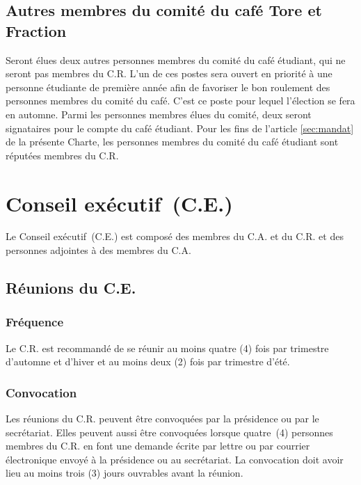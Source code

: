 \documentclass{aediroum}
\newcommand{\article}[1]{article \ref{#1}}
\begin{document}
\subsection{Autres membres du comité du café Tore et Fraction}\label{sec:autres-membres-du-comite-du-cafe-etudiant}

Seront élues deux autres personnes membres du comité du café étudiant, qui ne seront pas membres du C.R. L'un de ces postes sera ouvert en priorité à une personne étudiante de première année afin de favoriser le bon roulement des personnes membres du comité du café. C'est ce poste pour lequel l'élection se fera en automne. Parmi les personnes membres élues du comité, deux seront signataires pour le compte du café étudiant. Pour les fins de l'\article{sec:mandat} de la présente Charte, les personnes membres du comité du café étudiant sont réputées membres du C.R.

\section{Conseil exécutif~(C.E.)}
Le Conseil exécutif~(C.E.) est composé des membres du C.A. et du C.R. et des personnes
adjointes à des membres du C.A.

\subsection{Réunions du C.E.}\label{sec:reunions-du-conseil-dadministration}
\subsubsection{Fréquence}\label{sec:frequence}

Le C.R. est recommandé de se réunir au moins quatre (4) fois par trimestre d'automne et d'hiver et au moins deux (2) fois par trimestre d'été.

\subsubsection{Convocation}\label{sec:convocation-administration}

Les réunions du C.R. peuvent être convoquées par la présidence ou par le secrétariat. Elles peuvent aussi être convoquées lorsque quatre~(4) personnes membres du C.R. en font une demande écrite par lettre ou par courrier électronique envoyé à la présidence ou au secrétariat. La convocation doit avoir lieu au moins trois (3) jours ouvrables avant la réunion.
\end{document}
